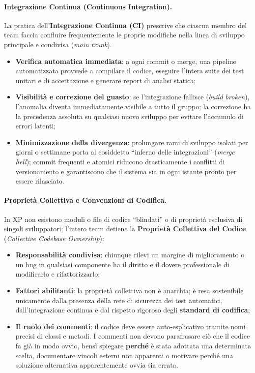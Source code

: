 \documentclass[12pt]{extarticle}
\begin{document}
\paragraph{Integrazione Continua (Continuous Integration).}
La pratica dell'\textbf{Integrazione Continua (CI)} prescrive che ciascun membro del team faccia confluire frequentemente le proprie modifiche nella linea di sviluppo principale e condivisa (\textit{main trunk}). 
\begin{itemize}
    \item \textbf{Verifica automatica immediata}: a ogni commit o merge, una pipeline automatizzata provvede a compilare il codice, eseguire l'intera suite dei test unitari e di accettazione e generare report di analisi statica;
    \item \textbf{Visibilità e correzione del guasto}: se l'integrazione fallisce (\textit{build broken}), l'anomalia diventa immediatamente visibile a tutto il gruppo; la correzione ha la precedenza assoluta su qualsiasi nuovo sviluppo per evitare l'accumulo di errori latenti;
    \item \textbf{Minimizzazione della divergenza}: prolungare rami di sviluppo isolati per giorni o settimane porta al cosiddetto ``inferno delle integrazioni'' (\textit{merge hell}); commit frequenti e atomici riducono drasticamente i conflitti di versionamento e garantiscono che il sistema sia in ogni istante pronto per essere rilasciato.
\end{itemize}

\paragraph{Proprietà Collettiva e Convenzioni di Codifica.}
In XP non esistono moduli o file di codice ``blindati'' o di proprietà esclusiva di singoli sviluppatori; l'intero team detiene la \textbf{Proprietà Collettiva del Codice} (\textit{Collective Codebase Ownership}):
\begin{itemize}
    \item \textbf{Responsabilità condivisa}: chiunque rilevi un margine di miglioramento o un bug in qualsiasi componente ha il diritto e il dovere professionale di modificarlo e rifattorizzarlo;
    \item \textbf{Fattori abilitanti}: la proprietà collettiva non è anarchia; è resa sostenibile unicamente dalla presenza della rete di sicurezza dei test automatici, dall'integrazione continua e dal rispetto rigoroso degli \textbf{standard di codifica};
    \item \textbf{Il ruolo dei commenti}: il codice deve essere auto-esplicativo tramite nomi precisi di classi e metodi. I commenti non devono parafrasare ciò che il codice fa già in modo ovvio, bensì spiegare \textbf{perché} è stata adottata una determinata scelta, documentare vincoli esterni non apparenti o motivare perché una soluzione alternativa apparentemente ovvia sia errata.
\end{itemize}
\end{document}
